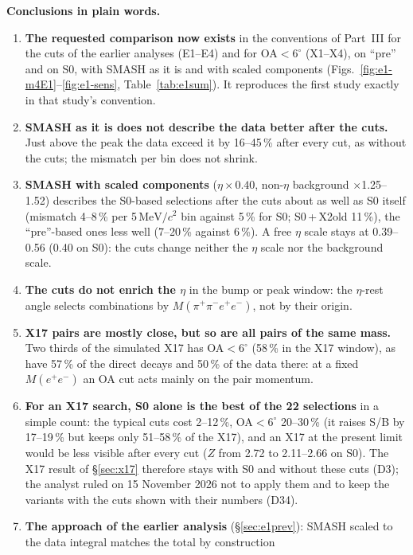 \documentclass[11pt,a4paper]{article}
\newcommand{\Mfour}{\ensuremath{M(\pi^{+}\pi^{-}e^{+}e^{-})}\xspace}
\newcommand{\Mee}{\ensuremath{M(e^{+}e^{-})}\xspace}
\newcommand{\MeVcc}{\ensuremath{\mathrm{MeV}/c^{2}}\xspace}
\newcommand{\cs}[1]{\textsf{#1}}%
\begin{document}
\textbf{Conclusions in plain words.}
\begin{enumerate}\setlength{\itemsep}{1pt}
\item \textbf{The requested comparison now exists} in the conventions of Part~III for the cuts of the earlier analyses (\cs{E1}--\cs{E4}) and for
      OA$<6^\circ$ (\cs{X1}--\cs{X4}), on ``pre'' and on S0, with SMASH as it is and with scaled components (Figs.~\ref{fig:e1-m4E1}--\ref{fig:e1-sens},
      Table~\ref{tab:e1sum}). It reproduces the first study exactly in that study's convention.
\item \textbf{SMASH as it is does not describe the data better after the cuts.} Just above the peak the data exceed it by 16--45\,\% after every cut,
      as without the cuts; the mismatch per bin does not shrink.
\item \textbf{SMASH with scaled components} ($\eta\times0.40$, non-$\eta$ background $\times$1.25--1.52) describes the S0-based selections after the
      cuts about as well as S0 itself (mismatch 4--8\,\% per 5\,\MeVcc bin against 5\,\% for S0; S0\,+\,\cs{X2old} 11\,\%), the ``pre''-based
      ones less well (7--20\,\% against 6\,\%). A free $\eta$ scale stays at 0.39--0.56
      (0.40 on S0): the cuts change neither the $\eta$ scale nor the background scale.
\item \textbf{The cuts do not enrich the $\eta$} in the bump or peak window: the $\eta$-rest angle selects combinations by \Mfour, not by their origin.
\item \textbf{X17 pairs are mostly close, but so are all pairs of the same mass.} Two thirds of the simulated X17 has OA$<6^\circ$ (58\,\% in the X17
      window), as have 57\,\% of the direct decays and 50\,\% of the data there: at a fixed \Mee an OA cut acts mainly on the pair momentum.
\item \textbf{For an X17 search, S0 alone is the best of the 22 selections} in a simple count: the typical cuts cost 2--12\,\%, OA$<6^\circ$
      20--30\,\% (it raises S/B by 17--19\,\% but keeps only 51--58\,\% of the X17), and an X17 at the present limit would be less visible after
      every cut ($Z$ from 2.72 to 2.11--2.66 on S0). The X17 result of
      \S\ref{sec:x17} therefore stays with S0 and without these cuts (D3); the analyst ruled on 15 November 2026 not to apply them and to keep the
      variants with the cuts shown with their numbers (D34).
\item \textbf{The approach of the earlier analysis} (\S\ref{sec:e1prev}): SMASH scaled to the data integral matches the total by construction

\end{enumerate}
\end{document}
